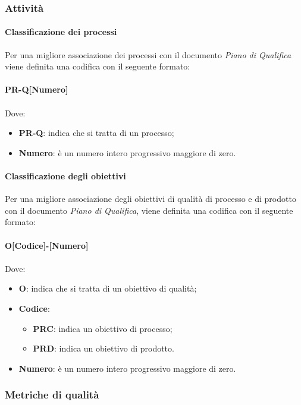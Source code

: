 \subsubsection{Attività}
\paragraph{Classificazione dei processi}
Per una migliore associazione dei processi con il documento \textit{Piano di Qualifica} viene definita una codifica con il seguente formato: \\
\\ \textbf{PR-Q[Numero]} \\
\\ Dove:
\begin{itemize}
	\item \textbf{PR-Q}: indica che si tratta di un processo;
	\item \textbf{Numero}: è un numero intero progressivo maggiore di zero.
\end{itemize}

\paragraph{Classificazione degli obiettivi}
Per una migliore associazione degli obiettivi di qualità di processo e di prodotto con il documento \textit{Piano di Qualifica}, viene definita una codifica con il seguente formato: \\
\\ \textbf{O[Codice]-[Numero]} \\
\\ Dove:
\begin{itemize}
	\item \textbf{O}: indica che si tratta di un obiettivo di qualità;
	\item \textbf{Codice}: 
		\begin{itemize}
			\item \textbf{PRC}: indica un obiettivo di processo;
			\item \textbf{PRD}: indica un obiettivo di prodotto. 
		\end{itemize}
	\item \textbf{Numero}: è un numero intero progressivo maggiore di zero.
\end{itemize}

\subsubsection{Metriche di qualità}
